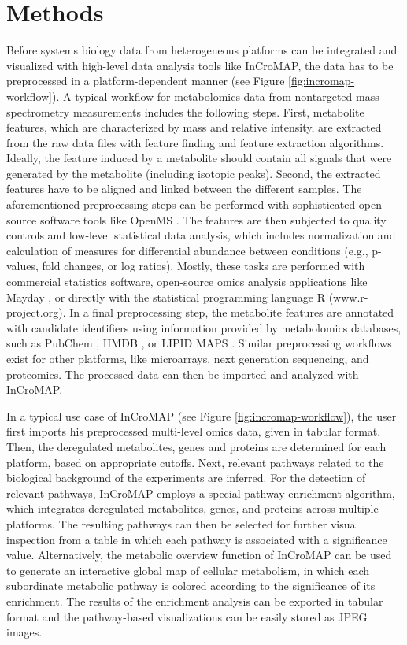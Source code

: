 \documentclass[final,5p,times,twocolumn]{elsarticle}
\newcommand\red[1]{{\color{red}#1}}
\begin{document}
\section{Methods}
Before systems biology data from heterogeneous platforms can be integrated and visualized with high-level data analysis tools like InCroMAP, the data has to be preprocessed in a platform-dependent manner (see Figure \ref{fig:incromap-workflow}). A typical workflow for metabolomics data from nontargeted mass spectrometry measurements includes the following steps. First, metabolite features, which are characterized by mass and relative intensity, are extracted from the raw data files with feature finding and feature extraction algorithms. Ideally, the feature induced by a metabolite should contain all signals that were generated by the metabolite (including isotopic peaks). Second, the extracted features have to be aligned and linked between the different samples. The aforementioned preprocessing steps can be performed with sophisticated open-source software tools like OpenMS \cite{Sturm2008}. The  features are then subjected to quality controls and low-level statistical data analysis, which includes 
normalization and calculation of measures for differential abundance between conditions (e.g., p-values, fold changes, or log ratios). Mostly, these tasks are performed with commercial statistics software, open-source omics analysis applications like Mayday \cite{Battke2010}, or directly with the statistical programming language R (www.r-project.org). In a final preprocessing step, the metabolite features are annotated with candidate identifiers using information provided by metabolomics databases, such as PubChem \cite{Wang2009}, HMDB \cite{Wishart2009}, or LIPID MAPS \cite{Sud2007}. Similar preprocessing workflows exist for other platforms, like microarrays, next generation sequencing, and proteomics. The processed data can then be imported and analyzed with InCroMAP.

In a typical use case of InCroMAP (see Figure \ref{fig:incromap-workflow}), the user first imports his preprocessed multi-level omics data, given in tabular format. Then, the \red{deregulated metabolites, genes and proteins} are determined for each platform, based on appropriate cutoffs. Next, relevant pathways related to the biological background of the experiments are inferred. For the detection of relevant pathways, InCroMAP employs a special pathway enrichment algorithm, which integrates \red{deregulated metabolites, genes, and proteins} across multiple platforms. The resulting pathways can then be selected for further visual inspection from a table in which each pathway is associated with a significance value. Alternatively, the metabolic overview function of InCroMAP can be used to generate an interactive global map of cellular metabolism, in which each subordinate metabolic pathway is colored according to the significance of its enrichment. The results of the enrichment analysis can be 
exported in tabular format and the pathway-based visualizations can be easily stored as JPEG images.
\end{document}
